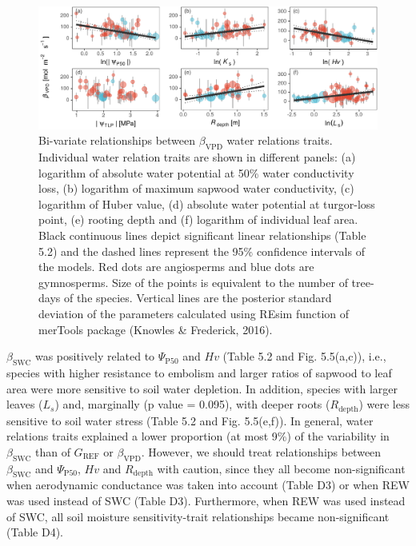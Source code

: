 \documentclass[11pt,twoside]{reedthesis}
\begin{document}
\begin{figure}[hbt!]

{\centering \includegraphics[width=1\linewidth]{figure/CH5/Figure_4} 

}

\caption[Bi-variate relationships between $\beta_{\text{VPD}}$ water relations traits.]{Bi-variate relationships between \(\beta_{\text{VPD}}\)
water relations traits. Individual water relation traits are shown in
different panels: (a) logarithm of absolute water potential at 50\%
water conductivity loss, (b) logarithm of maximum sapwood water
conductivity, (c) logarithm of Huber value, (d) absolute water potential
at turgor-loss point, (e) rooting depth and (f) logarithm of individual
leaf area. Black continuous lines depict significant linear
relationships (Table 5.2) and the dashed lines represent the 95\%
confidence intervals of the models. Red dots are angiosperms and blue
dots are gymnosperms. Size of the points is equivalent to the number of
tree-days of the species. Vertical lines are the posterior standard
deviation of the parameters calculated using REsim function of merTools
package (Knowles \& Frederick, 2016).}\label{fig:ch5fig4}
\end{figure}
\(\beta_{\text{SWC}}\) was positively related to
\textbar{}\(\Psi_{\text{P50}}\)\textbar{} and \(Hv\) (Table 5.2 and Fig.
5.5(a,c)), i.e., species with higher resistance to embolism and larger
ratios of sapwood to leaf area were more sensitive to soil water
depletion. In addition, species with larger leaves (\(L_s\)) and,
marginally (p value = 0.095), with deeper roots (\(R_{\text{depth}}\))
were less sensitive to soil water stress (Table 5.2 and Fig. 5.5(e,f)).
In general, water relations traits explained a lower proportion (at most
9\%) of the variability in \(\beta_{\text{SWC}}\) than of
\(G_{\text{REF}}\) or \(\beta_{\text{VPD}}\). However, we should treat
relationships between \(\beta_{\text{SWC}}\) and
\textbar{}\(\Psi_{\text{P50}}\)\textbar{}, \(Hv\) and
\(R_{\text{depth}}\) with caution, since they all become non-significant
when aerodynamic conductance was taken into account (Table D3) or when
REW was used instead of SWC (Table D3). Furthermore, when REW was used
instead of SWC, all soil moisture sensitivity-trait relationships became
non-significant (Table D4).\par
\end{document}
